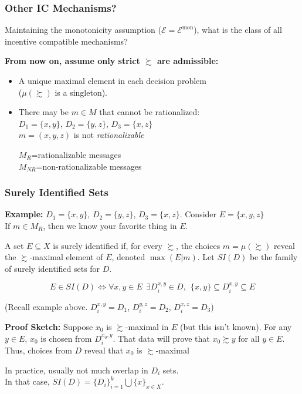 \begin{frame}
  \frametitle{Other IC Mechanisms?}

Maintaining the monotonicity assumption ($\mathcal{E}= \mathcal{E}^\mathrm{mon}$), what is the class of all incentive compatible mechanisms?

\bigskip

\textbf{From now on, assume only strict $\succsim$ are admissible:}
\begin{itemize}
\item A unique maximal element in each decision problem\\($\mu(\succsim)$ is a singleton).
\item There may be $m\in M$ that cannot be rationalized:\\
    $D_1=\{x,y\}$, $D_2=\{y,z\}$, $D_3=\{x,z\}$\\
    $m=(x,y,z)$ is not \emph{rationalizable}\\
    \smallskip

    $M_R$=rationalizable messages\\
    $M_{NR}$=non-rationalizable messages
\end{itemize}

\end{frame}




\begin{frame}
  \frametitle{Surely Identified Sets}
\textbf{Example:}
$D_1=\{x,y\}$, $D_2=\{y,z\}$, $D_3=\{x,z\}$. Consider $E = \{x,y,z\}$\\
If $m\in M_R$, then we know your favorite thing in $E$.\\

\begin{definition}
A set $E\subseteq X$ is surely identified if, for every $\succsim$, the choices $m=\mu(\succsim)$ reveal the $\succsim$-maximal element of $E$, denoted $\max(E|m)$. Let $SI(D)$ be the family of surely identified sets for $D$.
\end{definition}

\begin{lemma}
$$E\in SI(D) \Leftrightarrow \forall x,y\in E~~ \exists D_i^{x,y}\in D,~~ \{x,y\} \subseteq D_i^{x,y}\subseteq E$$
\end{lemma}

(Recall example above. $D_i^{x,y}=D_1$, $D_i^{y,z}=D_2$, $D_i^{x,z}=D_3$)

\textbf{Proof Sketch:} Suppose $x_0$ is $\succsim$-maximal in $E$ (but this isn't known). For any $y\in E$, $x_0$ is chosen from $D_i^{x_0,y}$. That data will prove that $x_0\succsim y$ for all $y\in E$. Thus, choices from $D$ reveal that $x_0$ is $\succsim$-maximal


In practice, usually not much overlap in $D_i$ sets.\\
In that case, $SI(D)=\{D_i\}_{i=1}^k \bigcup \{x\}_{x\in X}$.

\end{frame}

